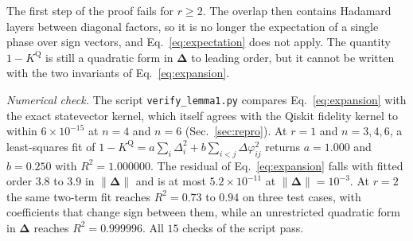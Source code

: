 \begin{remark}
\label{rem:reps}
The first step of the proof fails for $r\ge2$. The overlap then contains Hadamard layers
between diagonal factors, so it is no longer the expectation of a single phase over sign
vectors, and Eq.~\eqref{eq:expectation} does not apply. The
quantity $1-K^{\mathrm{Q}}$ is still a quadratic form in $\bm{\Delta}$ to leading order, but it
cannot be written with the two invariants of Eq.~\eqref{eq:expansion}.
\end{remark}

\emph{Numerical check.} The script \texttt{verify\_lemma1.py} compares
Eq.~\eqref{eq:expansion} with the exact statevector kernel, which itself agrees with the Qiskit
fidelity kernel to within $6\times10^{-15}$ at $n=4$ and $n=6$ (Sec.~\ref{sec:repro}). At $r=1$ and $n=3,4,6$, a
least-squares fit of $1-K^{\mathrm{Q}} = a\sum_i\Delta_i^2 + b\sum_{i<j}\Delta\varphi_{ij}^2$
returns $a=1.000$ and $b=0.250$ with $R^{2}=1.000000$. The residual of
Eq.~\eqref{eq:expansion} falls with fitted order $3.8$ to $3.9$ in $\|\bm{\Delta}\|$ and is at
most $5.2\times10^{-11}$ at $\|\bm{\Delta}\|=10^{-3}$. At $r=2$ the same two-term fit reaches
$R^{2}=0.73$ to $0.94$ on three test cases, with coefficients that change sign between them,
while an unrestricted quadratic form in $\bm{\Delta}$ reaches $R^{2}=0.999996$. All $15$ checks
of the script pass.

